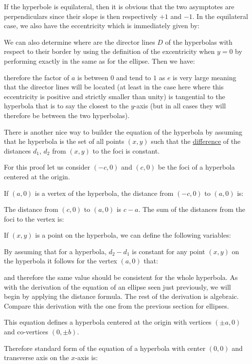	If the hyperbole is equilateral, then it is obvious that the two asymptotes are perpendiculars since their slope is then respectively $+1$ and $-1$. In the equilateral case, we also have the eccentricity which is immediately given by:
	
	We can also determine where are the director lines $D$ of the hyperbolas with respect to their border by using the definition of the excentricity when $y=0$ by performing exactly in the same as for the ellipse. Then we have:
	
	therefore the factor of $a$ is between $0$ and tend to $1$ as $e$ is very large meaning that the director lines will be located (at least in the case here where this eccentricity is positive and strictly smaller than unity) is tangential to the hyperbola that is to say the closest to the $y$-axis (but in all cases they will therefore be between the two hyperbolas).
	
	There is another nice way to builder the equation of the hyperbola by assuming that he hyperbola is the set of all points $(x,y)$ such that the \underline{difference} of the distances $d_1$, $d_2$ from $(x,y)$ to the foci is constant.

	For this proof let us consider $(-c,0)$ and $(c,0)$ be the foci of a hyperbola centered at the origin.

	If $(a,0)$ is a vertex of the hyperbola, the distance from $(-c,0)$ to $(a,0)$ is:
	
	The distance from $(c,0)$ to $(a,0)$ is $c-a$. The sum of the distances from the foci to the vertex is:
	
	If $(x,y)$ is a point on the hyperbola, we can define the following variables:
	
	By assuming that for a hyperbola, $d_2-d_1$ is constant for any point $(x,y)$ on the hyperbola it follows for the vertex $(a,0)$ that:
	
	and therefore the same value should be consistent for the whole hyperbola.  As with the derivation of the equation of an ellipse seen just previously, we will begin by applying the distance formula. The rest of the derivation is algebraic. Compare this derivation with the one from the previous section for ellipses.
	
	This equation defines a hyperbola centered at the origin with vertices $(\pm a,0)$ and co-vertices $(0,\pm b)$.
	
	Therefore standard form of the equation of a hyperbola with center $(0,0)$ and transverse axis on the $x$-axis is:
	

